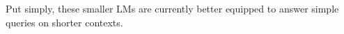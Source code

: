Put simply, these smaller LMs are currently better equipped to answer simple queries on shorter contexts.



% 





